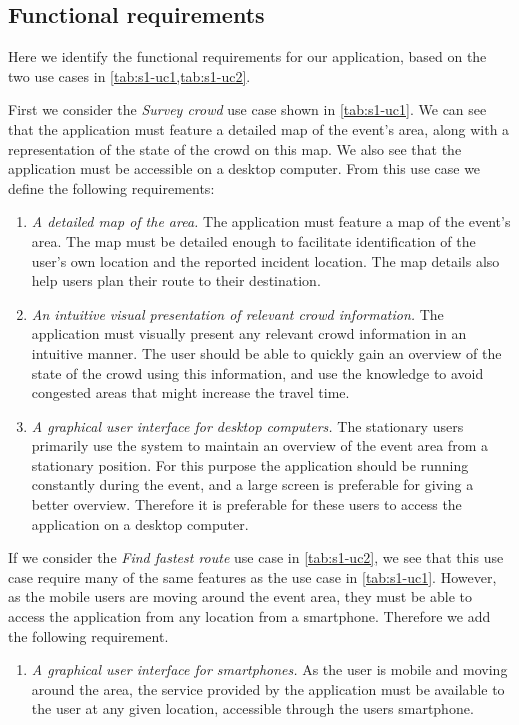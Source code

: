 \subsection{Functional requirements} \label{ss:s1_freqs}
Here we identify the functional requirements for our application, based on the two use cases in \cref{tab:s1-uc1,tab:s1-uc2}. 

First we consider the \emph{Survey crowd} use case shown in \cref{tab:s1-uc1}. We can see that the application must feature a detailed map of the event's area, along with a representation of the state of the crowd on this map. We also see that the application must be accessible on a desktop computer. From this use case we define the following requirements:

\begin{enumerate}
    \item \emph{A detailed map of the area.} The application must feature a map of the event's area. The map must be detailed enough to facilitate identification of the user's own location and the reported incident location. The map details also help users plan their route to their destination.
    \item \emph{An intuitive visual presentation of relevant crowd information.} The application must visually present any relevant crowd information in an intuitive manner. The user should be able to quickly gain an overview of the state of the crowd using this information, and use the knowledge to avoid congested areas that might increase the travel time.
    \item \emph{A graphical user interface for desktop computers.} The stationary users primarily use the system to maintain an overview of the event area from a stationary position. For this purpose the application should be running constantly during the event, and a large screen is preferable for giving a better overview. Therefore it is preferable for these users to access the application on a desktop computer.
\end{enumerate}

If we consider the \emph{Find fastest route} use case in \cref{tab:s1-uc2}, we see that this use case require many of the same features as the use case in \cref{tab:s1-uc1}. However, as the mobile users are moving around the event area, they must be able to access the application from any location from a smartphone. Therefore we add the following requirement.

\begin{enumerate}[resume]
    \item \emph{A graphical user interface for smartphones.} As the user is mobile and moving around the area, the service provided by the application must be available to the user at any given location, accessible through the users smartphone.

\end{enumerate}

